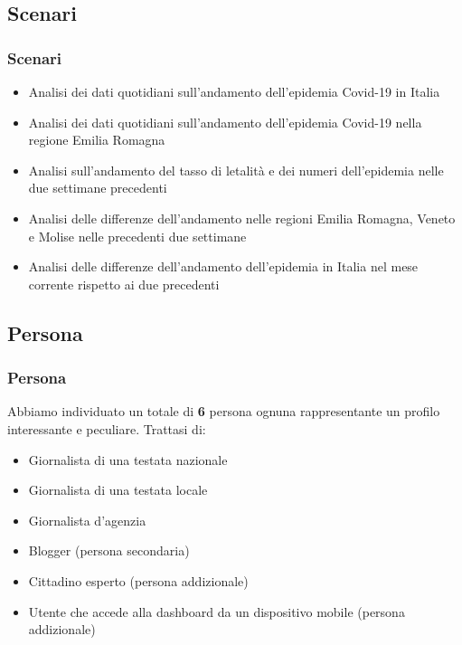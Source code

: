 \documentclass[handout]{beamer}
\begin{document}
		\subsection{Scenari}
		\begin{frame}
			\frametitle{Scenari}
			\begin{itemize}[<+->]
				\item Analisi dei dati quotidiani sull'andamento dell'epidemia Covid-19 in Italia\\
				\item Analisi dei dati quotidiani sull'andamento dell'epidemia Covid-19 nella regione Emilia Romagna\\
				\item Analisi sull'andamento del tasso di letalità e dei numeri dell'epidemia nelle due settimane precedenti\\
				\item Analisi delle differenze dell'andamento nelle regioni Emilia Romagna, Veneto e Molise nelle precedenti due settimane\\
				\item Analisi delle differenze dell'andamento dell'epidemia in Italia nel mese corrente rispetto ai due precedenti\\
			\end{itemize}
		\end{frame}

		\subsection{Persona}
		\begin{frame}
			\frametitle{Persona}
			Abbiamo individuato un totale di \textbf{6} persona ognuna rappresentante un profilo interessante e peculiare. Trattasi di:
			\begin{itemize}[<+->]
				\item Giornalista di una testata nazionale\\
				\item Giornalista di una testata locale\\
				\item Giornalista d'agenzia\\
				\item Blogger (persona secondaria)\\
				\item Cittadino esperto (persona addizionale)\\
				\item Utente che accede alla dashboard da un dispositivo mobile (persona addizionale)\\
			\end{itemize}
		\end{frame}
\end{document}
